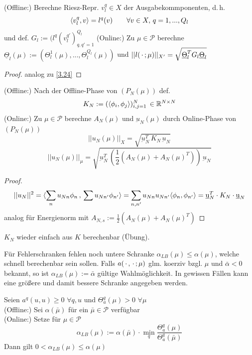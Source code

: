\begin{kor}
	(Offline:) Berechne Riesz-Repr. $v_l^q \in X$ der Ausgabekommponenten, d.\,h.
	\[
		\langle v_l^q, v \rangle = l^q(v) \qquad \forall v \in X, \, q=1,...,Q_l
	\]
	und def. $G_l := (l^q(v_l^{q'})_{q, q' =1}^{Q_l}$
	(Online:) Zu $\mu \in \mathcal{P}$ berechne $\underline{\Theta}_l (\mu) := (\Theta_l^1(\mu),...,\Theta_l^{Q_l}(\mu))$ und $||l(\,\cdot\,;\mu)||_{X'} = \sqrt{\underline{\Theta}_l^T G_l \underline{\Theta}_l}$
\end{kor}

\begin{proof}
	analog zu \ref{3.24}
\end{proof}

\begin{kor}
	(Offline:) Nach der Offline-Phase von $(P_N(\mu))$ def.
	\[
		K_N := (\dotp{\phi_i}{\phi_j})_{i,j=1}^N \, \in \R^{N \times N}
	\]
	(Online:) Zu $\mu \in \mathcal{P}$ berechne $A_N(\mu)$ und $\underbar u_N(\mu)$ durch Online-Phase von $(P_N(\mu))$
	\[
		|| u_N(\mu)||_X = \sqrt{\underbar u_N^T \, K_N \, \underbar u_N}
	\]
	\[
		|| u_N(\mu)||_{\mu} = \sqrt{\underbar u_N^T \, (\frac{1}{2} (A_N(\mu) + A_N(\mu)^T)) \, \underbar u_N}
	\]
\end{kor}

\begin{proof}
	\begin{align*}
		||u_N||^2 = \dotp{\sum_n u_{Nn} \phi_n \, }{ \, \sum u_{Nn'} \phi_{n'}} = \sum_{n, n'} u_{Nn} u_{Nn'} \dotp{\phi_n}{\phi_{n'}} = \underbar u_N^T \cdot K_N \cdot \underbar u_N
	\end{align*}	
	analog für Energienorm mit $A_{N,s} := \frac{1}{2} (A_N(\mu) + A_N(\mu)^T)$
\end{proof}

\begin{bem}
	$K_N$ wieder einfach aus $K$ berechenbar (Übung).
\end{bem}

Für Fehlerschranken fehlen noch untere Schranke $\alpha_{LB} (\mu) \le \alpha (\mu)$, welche schnell berechenbar sein sollen.
Falls $a(\,\cdot\, , \,\cdot\, ; \mu)$ glm. koerziv bzgl. $\mu$ und $\bar{\alpha} < 0$ bekannt, so ist $\alpha_{LB} (\mu) := \bar{\alpha}$ gültige Wahlmöglichkeit.
In gewissen Fällen kann eine größere und damit bessere Schranke angegeben werden.

\begin{satz}
	Seien $a^q(u,u) \geq 0 \,\, \forall q,u$ und $\Theta_a^q (\mu) > 0 \,\, \forall \mu$ \\
	(Offline:) Sei $\alpha(\bar{\mu})$ für ein $\bar{\mu} \in \mathcal{P}$ verfügbar \\
	(Online:) Setze für $\mu \in \mathcal{P}$
	\[
		\alpha_{LB} (\mu) := \alpha(\bar{\mu}) \cdot \min_{q} \frac{\Theta_a^q(\mu)}{\Theta_a^q(\bar{\mu})}
	\]
	Dann gilt $0 < \alpha_{LB} (\mu) \leq \alpha(\mu)$
\end{satz}


